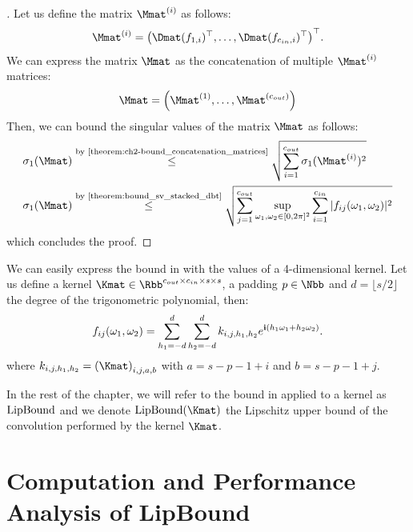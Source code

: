 \begin{proof}[]
  Let us define the matrix $\Mmat^{(i)}$ as follows:
\begin{equation}
  \Mmat^{(i)} = \leftmat \Dmat(f_{1, i})^\top, \dots, \Dmat(f_{\cin, i})^\top \rightmat^\top .
\end{equation}
We can express the matrix $\Mmat$ as the concatenation of multiple $\Mmat^{(i)}$ matrices:
\begin{equation}
  \Mmat = \leftmat \Mmat^{(1)}, \dots, \Mmat^{(\cout)} \rightmat
\end{equation}
Then, we can bound the singular values of the matrix $\Mmat$ as follows:
\begin{align}
  \sigma_1\left(\Mmat\right) &\stackrel{\text{by \Cref{theorem:ch2-bound_concatenation_matrices}}}{\leq} \sqrt{\sum_{i=1}^{\cout} \sigma_1(\Mmat^{(i)})^2} \\
  \sigma_1\left(\Mmat\right) &\stackrel{\text{by \Cref{theorem:bound_sv_stacked_dbt}}}{\leq} \sqrt{\sum_{j=1}^{\cout} \sup_{\omega_1, \omega_2 \in [0, 2\pi]^2} \sum_{i=1}^{\cin} |f_{ij}(\omega_1, \omega_2)|^2 }
\end{align}
which concludes the proof. 
\end{proof}

\endgroup
\pagebreak

We can easily express the bound in  with the values of a 4-dimensional kernel.
Let us define a kernel $\Kmat \in \Rbb^{\cout \times \cin \times s \times s}$, a padding $p \in \Nbb$ and $d = \lfloor s / 2 \rfloor$ the degree of the trigonometric polynomial, then:
\begin{equation}
  f_{ij}(\omega_1, \omega_2) = \sum_{h_1 = -d}^d \sum_{h_2 = -d}^d k_{i, j, h_1,h_2} e^{\mathbf{i} (h_1 \omega_1 + h_2 \omega_2)}.
\end{equation}
where $k_{i, j, h_1,h_2} = \leftmat \Kmat \rightmat_{i, j, a, b}$ with $a =  s - p - 1 + i$ and $b =  s - p - 1 + j$.

In the rest of the chapter, we will refer to the bound in  applied to a kernel as $\mathrm{LipBound}$ and we denote $\lipbound(\Kmat)$ the Lipschitz upper bound of the convolution performed by the kernel $\Kmat$. 


\section{Computation and Performance Analysis of LipBound}
\label{section:ch5-computation_and_performance_analysis_of_lipbound}

